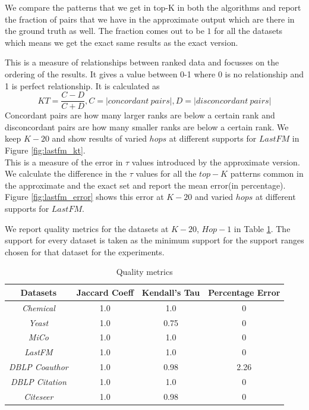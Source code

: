  We compare the patterns that we get in top-K in both the algorithms and report the fraction of pairs that we have in the approximate output which are there in the ground truth as well. The fraction comes out to be $1$ for all the datasets which means we get the exact same results as the exact version.

 This is a measure of relationships between ranked data and focusses on the ordering of the results. It gives a value between 0-1 where 0 is no relationship and 1 is perfect relationship. It is calculated as \[KT = \dfrac{C-D}{C+D}, C = |concordant\ pairs|, D = |disconcordant\ pairs|\] Concordant pairs are how many larger ranks are below a certain rank and disconcordant pairs are how many smaller ranks are below a certain rank. We keep $K-20$ and show results of varied $hops$ at different supports for $LastFM$ in Figure \ref{fig:lastfm_kt}.\\ 

 This is a measure of the error in $\tau$ values introduced by the approximate version. We calculate the difference in the $\tau$ values for all the $top-K$ patterns common in the approximate and the exact set and report the mean error(in percentage). Figure \ref{fig:lastfm_error} shows this error at $K-20$ and varied $hops$ at different supports for $LastFM$.

\par We report quality metrics for the datasets at $K-20$, $Hop-1$ in Table \ref{tab:quality}. The support for every dataset is taken as the minimum support for the support ranges chosen for that dataset for the experiments. 

\begin{table}[tb!]
	\vspace{-2mm}
	\begin{center}
		\vspace{-1mm}
		\centering
		\caption{Quality metrics\label{tab:quality}}
		\vspace{-3mm}
		\begin{tabular} {cccc}
			\hline
			Datasets  & Jaccard Coeff & Kendall's Tau  & Percentage Error\\			 
			\hline 
			{\em Chemical}   &   1.0   &  1.0   & 0\\
			{\em Yeast}   &   1.0    &  0.75  & 0\\
			{\em MiCo}   &   1.0    &  1.0   & 0\\ 
			{\em LastFM}   &  1.0   &  1.0 & 0\\
			{\em DBLP Coauthor}   &   1.0  &  0.98  & 2.26\\ 
			{\em DBLP Citation}   &   1.0   &  1.0   & 0\\
			{\em Citeseer}   &   1.0   &  0.98 & 0\\
			
			\hline
		\end{tabular}
	\end{center}
	\vspace{-4mm}
\end{table}

